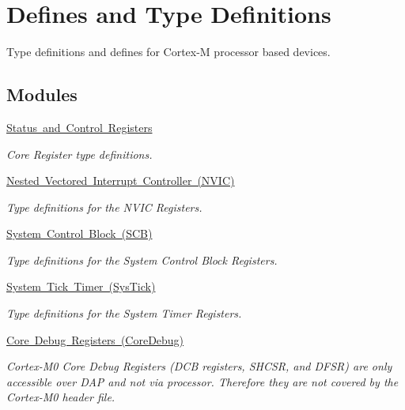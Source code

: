 \hypertarget{group___c_m_s_i_s__core__register}{}\section{Defines and Type Definitions}
\label{group___c_m_s_i_s__core__register}


Type definitions and defines for Cortex-\/M processor based devices.  


\subsection*{Modules}
\begin{DoxyCompactItemize}
\item 
\mbox{\hyperlink{group___c_m_s_i_s___c_o_r_e}{Status and Control Registers}}
\begin{DoxyCompactList}\small\item\em Core Register type definitions. \end{DoxyCompactList}\item 
\mbox{\hyperlink{group___c_m_s_i_s___n_v_i_c}{Nested Vectored Interrupt Controller (\+N\+V\+I\+C)}}
\begin{DoxyCompactList}\small\item\em Type definitions for the N\+V\+IC Registers. \end{DoxyCompactList}\item 
\mbox{\hyperlink{group___c_m_s_i_s___s_c_b}{System Control Block (\+S\+C\+B)}}
\begin{DoxyCompactList}\small\item\em Type definitions for the System Control Block Registers. \end{DoxyCompactList}\item 
\mbox{\hyperlink{group___c_m_s_i_s___sys_tick}{System Tick Timer (\+Sys\+Tick)}}
\begin{DoxyCompactList}\small\item\em Type definitions for the System Timer Registers. \end{DoxyCompactList}\item 
\mbox{\hyperlink{group___c_m_s_i_s___core_debug}{Core Debug Registers (\+Core\+Debug)}}
\begin{DoxyCompactList}\small\item\em Cortex-\/\+M0 Core Debug Registers (D\+CB registers, S\+H\+C\+SR, and D\+F\+SR) are only accessible over D\+AP and not via processor. Therefore they are not covered by the Cortex-\/\+M0 header file. \end{DoxyCompactList}\item 

\end{DoxyCompactItemize}
